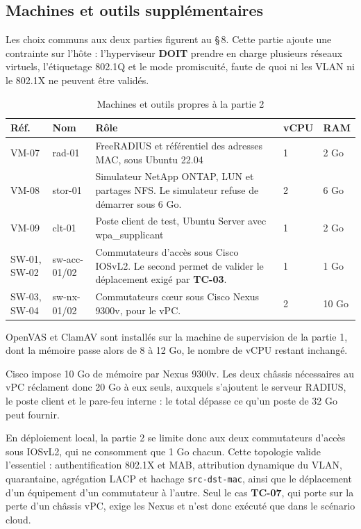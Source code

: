 \documentclass[11pt,a4paper]{article}
\newcommand{\ttb}[1]{\texttt{\small #1}}
\newcommand{\rid}[1]{\textcolor{primary}{\textbf{\small #1}}}
\begin{document}
\subsection{Machines et outils supplémentaires}\label{sec:envp2}
Les choix communs aux deux parties figurent au \S\,8. Cette partie ajoute une contrainte sur l'hôte : l'hyperviseur \textbf{DOIT} prendre en charge plusieurs réseaux virtuels, l'étiquetage 802.1Q et le mode promiscuité, faute de quoi ni les VLAN ni le 802.1X ne peuvent être validés.

\begin{table}[H]
\centering
\caption{Machines et outils propres à la partie 2}
\begin{tabularx}{\textwidth}{L{1.9cm} L{2.9cm} Y C{0.9cm} C{0.9cm}}
\toprule
{}\textbf{Réf.} & \textbf{Nom} & \textbf{Rôle} & \textbf{vCPU} & \textbf{RAM} \\
\midrule
VM-07 & \ttfamily rad-01 & FreeRADIUS et référentiel des adresses MAC, sous Ubuntu 22.04 & 1 & 2 Go \\
VM-08 & \ttfamily stor-01 & Simulateur NetApp ONTAP, LUN et partages NFS. Le simulateur refuse de démarrer sous 6 Go. & 2 & 6 Go \\
VM-09 & \ttfamily clt-01 & Poste client de test, Ubuntu Server avec \ttfamily wpa\_supplicant & 1 & 2 Go \\
SW-01, SW-02 & \ttfamily sw-acc-01/02 & Commutateurs d'accès sous Cisco IOSvL2. Le second permet de valider le déplacement exigé par \rid{TC-03}. & 1 & 1 Go \\
SW-03, SW-04 & \ttfamily sw-nx-01/02 & Commutateurs cœur sous Cisco Nexus 9300v, pour le vPC. & 2 & 10 Go \\
\bottomrule
\end{tabularx}
\end{table}

OpenVAS et ClamAV sont installés sur la machine de supervision de la partie 1, dont la mémoire passe alors de 8 à 12 Go, le nombre de vCPU restant inchangé.

\begin{alertbox}
Cisco impose 10 Go de mémoire par Nexus 9300v. Les deux châssis nécessaires au vPC réclament donc 20 Go à eux seuls, auxquels s'ajoutent le serveur RADIUS, le poste client et le pare-feu interne : le total dépasse ce qu'un poste de 32 Go peut fournir.

En déploiement local, la partie 2 se limite donc aux deux commutateurs d'accès sous IOSvL2, qui ne consomment que 1 Go chacun. Cette topologie valide l'essentiel : authentification 802.1X et MAB, attribution dynamique du VLAN, quarantaine, agrégation LACP et hachage \ttb{src-dst-mac}, ainsi que le déplacement d'un équipement d'un commutateur à l'autre. Seul le cas \rid{TC-07}, qui porte sur la perte d'un châssis vPC, exige les Nexus et n'est donc exécuté que dans le scénario cloud.
\end{alertbox}
\end{document}
